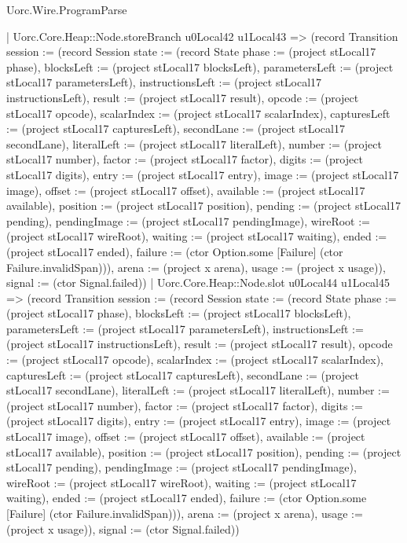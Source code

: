 \begin{lexlean}{Uorc.Wire.ProgramParse}
\begin{semanticmodule}
{          | Uorc.Core.Heap::Node.storeBranch u0Local42 u1Local43 => (record Transition {session := (record Session {state := (record State {phase := (project stLocal17 phase), blocksLeft := (project stLocal17 blocksLeft), parametersLeft := (project stLocal17 parametersLeft), instructionsLeft := (project stLocal17 instructionsLeft), result := (project stLocal17 result), opcode := (project stLocal17 opcode), scalarIndex := (project stLocal17 scalarIndex), capturesLeft := (project stLocal17 capturesLeft), secondLane := (project stLocal17 secondLane), literalLeft := (project stLocal17 literalLeft), number := (project stLocal17 number), factor := (project stLocal17 factor), digits := (project stLocal17 digits), entry := (project stLocal17 entry), image := (project stLocal17 image), offset := (project stLocal17 offset), available := (project stLocal17 available), position := (project stLocal17 position), pending := (project stLocal17 pending), pendingImage := (project stLocal17 pendingImage), wireRoot := (project stLocal17 wireRoot), waiting := (project stLocal17 waiting), ended := (project stLocal17 ended), failure := (ctor Option.some [Failure] (ctor Failure.invalidSpan))}), arena := (project x arena), usage := (project x usage)}), signal := (ctor Signal.failed)})
          | Uorc.Core.Heap::Node.slot u0Local44 u1Local45 => (record Transition {session := (record Session {state := (record State {phase := (project stLocal17 phase), blocksLeft := (project stLocal17 blocksLeft), parametersLeft := (project stLocal17 parametersLeft), instructionsLeft := (project stLocal17 instructionsLeft), result := (project stLocal17 result), opcode := (project stLocal17 opcode), scalarIndex := (project stLocal17 scalarIndex), capturesLeft := (project stLocal17 capturesLeft), secondLane := (project stLocal17 secondLane), literalLeft := (project stLocal17 literalLeft), number := (project stLocal17 number), factor := (project stLocal17 factor), digits := (project stLocal17 digits), entry := (project stLocal17 entry), image := (project stLocal17 image), offset := (project stLocal17 offset), available := (project stLocal17 available), position := (project stLocal17 position), pending := (project stLocal17 pending), pendingImage := (project stLocal17 pendingImage), wireRoot := (project stLocal17 wireRoot), waiting := (project stLocal17 waiting), ended := (project stLocal17 ended), failure := (ctor Option.some [Failure] (ctor Failure.invalidSpan))}), arena := (project x arena), usage := (project x usage)}), signal := (ctor Signal.failed)})
}
\end{semanticmodule}
\end{lexlean}
